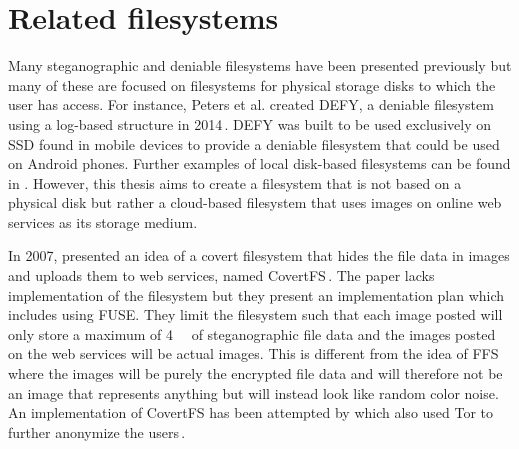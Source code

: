 \section{Related filesystems}
\label{sec:rel_fs}
Many steganographic and deniable filesystems have been presented previously but many of these are focused on filesystems for physical storage disks to which the user has access. For instance, Peters et al. created DEFY, a deniable filesystem using a \mbox{log-based} structure in 2014\,\cite{petersDEFYDeniableFile2014}. DEFY was built to be used exclusively on \gls{SSD} found in mobile devices to provide a deniable filesystem that could be used on Android phones. Further examples of local \mbox{disk-based} filesystems can be found in \cite{andersonSteganographicFileSystem1998, mcdonaldStegFSSteganographicFile2000, domingo-ferrerSharedSteganographicFile2008, hanMultiuserSteganographicFile2010}. However, this thesis aims to create a filesystem that is not based on a physical disk but rather a \mbox{cloud-based} filesystem that uses images on online web services as its storage medium. 

In 2007, \citeauthor{baliga2007web} presented an idea of a covert filesystem that hides the file data in images and uploads them to web services, named CovertFS\,\cite{baliga2007web}. The paper lacks implementation of the filesystem but they present an implementation plan which includes using \gls{FUSE}. They limit the filesystem such that each image posted will only store a maximum of \SI{4}{\kilo\byte} of steganographic file data and the images posted on the web services will be actual images. This is different from the idea of \gls{FFS} where the images will be purely the encrypted file data and will therefore not be an image that represents anything but will instead look like random color noise. An implementation of CovertFS has been attempted by \citeauthor{sosaSuperSecretFile2007} which also used Tor to further anonymize the users\,\cite{sosaSuperSecretFile2007}.

